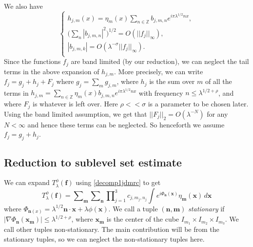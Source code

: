 \documentclass[12pt]{amsart}
\newcommand*{\Z}{\mathbb{Z}}
\begin{document}
%
We also have
%
\begin{equation}
    \begin{cases}
    h_{j,m}(x)=\eta_m(x)\sum_{n\in \Z} b_{j,m,n}e^{i\pi \lambda^{1/2}n x},\\
    \big(\sum_n |b_{j,m,n}|^2\big)^{1/2}=O(||f_j||_\infty),\\
    |b_{j,m,k}|=O(\lambda^{-\sigma}||f_j||_\infty).\\
\end{cases}
\end{equation}
Since the functions $f_j$ are band limited (by our reduction), we can neglect the tail terms in the above expansion of $h_{j,m}$. More precisely, we can write 
$f_j=g_j+h_j+F_j$ where $g_j=\sum_m g_{j,m}$, where $h_j$ is the sum over $m$ of all the terms in $h_{j,m}=\sum_{n\in \Z} \eta_m(x)b_{j,m,n}e^{i\pi\lambda^{1/2}nx}$ with frequency $n\leq \lambda^{1/2+\rho}$, and where $F_j$ is whatever is left over. Here $\rho<<\sigma$ is a parameter to be chosen later. Using the band limited assumption, we get that $||F_j||_2=O(\lambda^{-N})$ for any $N<\infty$ and hence these terms can be neglected. So henceforth we assume $f_j=g_j+h_j$.

\subsection{Reduction to sublevel set estimate}
We can expand $T_\lambda^\phi(\boldsymbol{f})$ using \eqref{decomp1jdmrc} to get
\begin{equation}
    T_\lambda^\phi(\boldsymbol{f})=\sum\nolimits_{\boldsymbol{m}}\sum\nolimits_{\boldsymbol{n}}\prod\nolimits_{j=1}^3 c_{j,m_j,n_j} \int e^{i\Phi_{\boldsymbol{n}}(\boldsymbol{x})}\eta_{\boldsymbol{m}}(\boldsymbol{x}) \, d\boldsymbol{x}
\end{equation}
where $\Phi_{\boldsymbol{n}(x)}=\lambda^{1/2}\boldsymbol{n}\cdot \boldsymbol{x}+\lambda \phi(\boldsymbol{x})$. We call a tuple $(\boldsymbol{n},\boldsymbol{m})$ \emph{stationary} if $|\nabla \Phi_{\boldsymbol{n}}(\boldsymbol{x}_{\boldsymbol{m}})|\leq \lambda^{1/2+\rho}$, where $\boldsymbol{x}_{\boldsymbol{m}}$ is the center of the cube $I_{m_1}\times I_{m_2}\times I_{m_3}$. We call other tuples non-stationary. The main contribution will be from the stationary tuples, so we can neglect the non-stationary tuples here.
\end{document}

